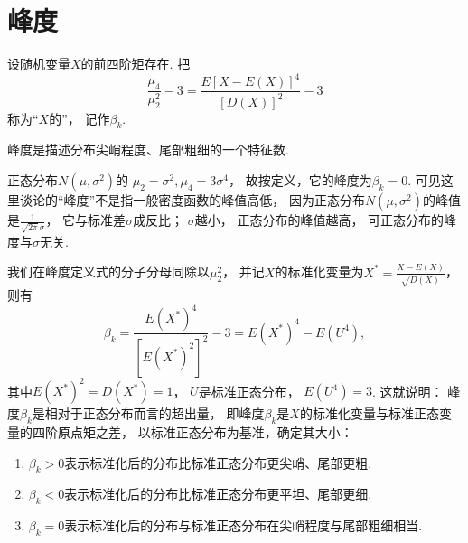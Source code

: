 \section{峰度}
\begin{definition}
设随机变量\(X\)的前四阶矩存在.
把\[
	\frac{\mu_4}{\mu_2^2}-3
	=\frac{E[X-E(X)]^4}{[D(X)]^2}-3
\]称为“\(X\)的”，
记作\(\beta_k\).
\end{definition}

峰度是描述分布尖峭程度、尾部粗细的一个特征数.

正态分布\(N(\mu,\sigma^2)\)的
\(\mu_2=\sigma^2,
\mu_4=3\sigma^4\)，
故按定义，它的峰度为\(\beta_k=0\).
可见这里谈论的“峰度”不是指一般密度函数的峰值高低，
因为正态分布\(N(\mu,\sigma^2)\)的峰值是\(\frac1{\sqrt{2\pi}\sigma}\)，
它与标准差\(\sigma\)成反比；
\(\sigma\)越小，
正态分布的峰值越高，
可正态分布的峰度与\(\sigma\)无关.

我们在峰度定义式的分子分母同除以\(\mu_2^2\)，
并记\(X\)的标准化变量为\(X^*=\frac{X-E(X)}{\sqrt{D(X)}}\)，
则有\[
	\beta_k
	= \frac{E(X^*)^4}{[E(X^*)^2]^2}-3
	= E(X^*)^4-E(U^4),
\]
其中\(E(X^*)^2=D(X^*)=1\)，
\(U\)是标准正态分布，
\(E(U^4)=3\).
这就说明：
峰度\(\beta_k\)是相对于正态分布而言的超出量，
即峰度\(\beta_k\)是\(X\)的标准化变量与标准正态变量的四阶原点矩之差，
以标准正态分布为基准，确定其大小：
\begin{enumerate}
	\item \(\beta_k>0\)表示标准化后的分布比标准正态分布更尖峭、尾部更粗.
	\item \(\beta_k<0\)表示标准化后的分布比标准正态分布更平坦、尾部更细.
	\item \(\beta_k=0\)表示标准化后的分布与标准正态分布在尖峭程度与尾部粗细相当.
\end{enumerate}
